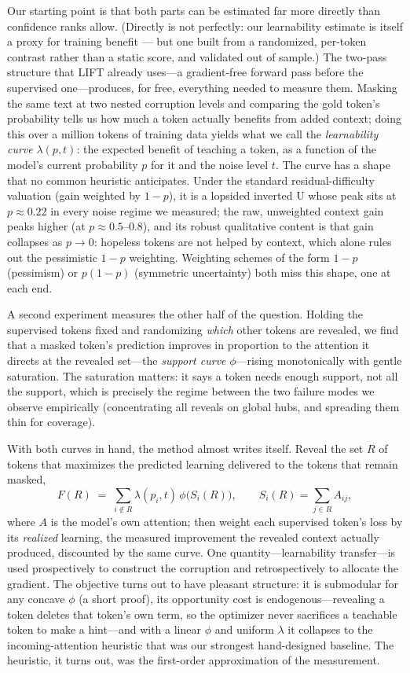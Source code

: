 \documentclass{article} %
\begin{document}
Our starting point is that both parts can be estimated far more directly than confidence ranks allow. (Directly is not perfectly: our learnability estimate is itself a proxy for training benefit --- but one built from a randomized, per-token contrast rather than a static score, and validated out of sample.) The two-pass structure that LIFT already uses---a gradient-free forward pass before the supervised one---produces, for free, everything needed to measure them. Masking the same text at two nested corruption levels and comparing the gold token's probability tells us how much a token actually benefits from added context; doing this over a million tokens of training data yields what we call the \emph{learnability curve} $\lambda(p, t)$: the expected benefit of teaching a token, as a function of the model's current probability $p$ for it and the noise level $t$. The curve has a shape that no common heuristic anticipates. Under the standard residual-difficulty valuation (gain weighted by $1-p$), it is a lopsided inverted U whose peak sits at $p \approx 0.22$ in every noise regime we measured; the raw, unweighted context gain peaks higher (at $p \approx 0.5$--$0.8$), and its robust qualitative content is that gain collapses as $p \to 0$: hopeless tokens are not helped by context, which alone rules out the pessimistic $1-p$ weighting. Weighting schemes of the form $1-p$ (pessimism) or $p(1-p)$ (symmetric uncertainty) both miss this shape, one at each end.

A second experiment measures the other half of the question. Holding the supervised tokens fixed and randomizing \emph{which} other tokens are revealed, we find that a masked token's prediction improves in proportion to the attention it directs at the revealed set---the \emph{support curve} $\phi$---rising monotonically with gentle saturation. The saturation matters: it says a token needs enough support, not all the support, which is precisely the regime between the two failure modes we observe empirically (concentrating all reveals on global hubs, and spreading them thin for coverage).

With both curves in hand, the method almost writes itself. Reveal the set $R$ of tokens that maximizes the predicted learning delivered to the tokens that remain masked,
\[
F(R) \;=\; \sum_{i \notin R} \lambda(p_i, t)\, \phi\!\big(S_i(R)\big),
\qquad S_i(R) = \sum_{j \in R} A_{ij},
\]
where $A$ is the model's own attention; then weight each supervised token's loss by its \emph{realized} learning, the measured improvement the revealed context actually produced, discounted by the same curve. One quantity---learnability transfer---is used prospectively to construct the corruption and retrospectively to allocate the gradient. The objective turns out to have pleasant structure: it is submodular for any concave $\phi$ (a short proof), its opportunity cost is endogenous---revealing a token deletes that token's own term, so the optimizer never sacrifices a teachable token to make a hint---and with a linear $\phi$ and uniform $\lambda$ it collapses to the incoming-attention heuristic that was our strongest hand-designed baseline. The heuristic, it turns out, was the first-order approximation of the measurement.
\end{document}
